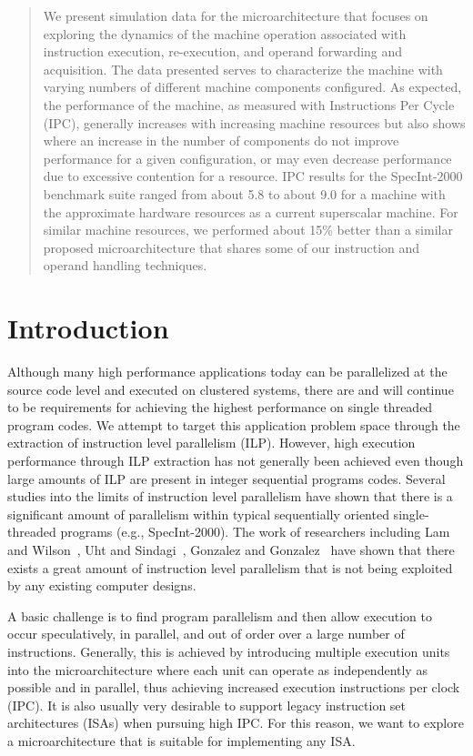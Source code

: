 \documentclass[10pt,dvips]{article}
\begin{document}
\begin{abstract}
We present simulation data for the microarchitecture that
focuses on exploring the dynamics of the machine
operation associated with instruction execution, re-execution,
and operand forwarding and acquisition.
The data presented serves to characterize the machine
with varying numbers of different machine components configured.
As expected, the performance of the machine, as measured with
Instructions Per Cycle (IPC), generally increases with increasing
machine resources but also shows where an increase in 
the number of
components do not improve performance for a given 
configuration, or may even decrease performance due to
excessive contention for a resource.
IPC results for the SpecInt-2000 benchmark suite ranged
from about 5.8 to about 9.0 for
a machine with the approximate hardware resources as a
current superscalar machine.
For similar machine resources, we performed about 15\% better than
a similar proposed microarchitecture that shares some of
our instruction and operand handling techniques.
%
\end{abstract}
%
%
\section{Introduction}
%
Although many high performance applications today
can be parallelized at the source code level 
and executed on clustered systems,
there are and will continue
to be requirements for achieving the highest performance
on single threaded program codes.
We attempt to target this application problem space
through the extraction of instruction level parallelism (ILP).
However, 
high execution performance through ILP
extraction has not generally been achieved even though
large amounts of ILP are present in integer sequential programs
codes.
Several studies into the limits of instruction level 
parallelism have shown that there is 
a significant amount of parallelism within
typical sequentially oriented single-threaded programs
(e.g., SpecInt-2000).  
The work of researchers including 
Lam and Wilson~\cite{Lam92},
Uht and Sindagi~\cite{Uht95},
Gonzalez and Gonzalez~\cite{Gon97}
have shown that there exists a great amount of instruction level
parallelism that is not being exploited by any existing
computer designs.

A basic challenge 
is to find program parallelism and then allow execution to occur
speculatively, in parallel, and out of order over 
a large number of instructions.
Generally, this is achieved by introducing multiple
execution units into the microarchitecture where each unit
can operate as independently as possible and in parallel, thus
achieving increased execution instructions per clock (IPC).
It is also usually very desirable to support legacy instruction
set architectures (ISAs) when pursuing high IPC. 
For this reason, we want to explore a
microarchitecture that is suitable for implementing any ISA.
\end{document}
